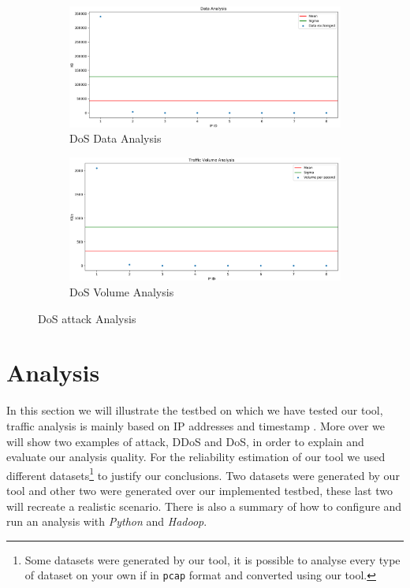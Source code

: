 \begin{figure}[h]
	\begin{subfigure}{0.48\textwidth}
		\includegraphics[width=\textwidth]{imgs/DoSMixed-data_analysis.png}
  		\caption{DoS Data Analysis}
  		\label{fig:ddos_data}
	\end{subfigure}
	\hspace*{\fill} %
	\begin{subfigure}{0.48\textwidth}
  		\includegraphics[width=\textwidth]{imgs/DoSMixed-volume_analysis.png}
  		\caption{DoS Volume Analysis}
  		\label{fig:dos_volume}
	\end{subfigure}
	\caption{DoS attack Analysis}
	\label{fig:dos_analysis}
\end{figure}
\section{Analysis}
\label{sec:analysis}
In this section we will illustrate the testbed on which we have tested our tool, traffic analysis is mainly based on IP addresses and timestamp \cite{ddos_forensics}. 
More over we will show two examples of attack, DDoS and DoS, in order to explain and evaluate our analysis quality.
For the reliability estimation of our tool we used different datasets\footnote{Some datasets were generated by our tool, it is possible to analyse every type of dataset on your own if in \texttt{pcap} format and converted using our tool.} to justify our conclusions. 
Two datasets were generated by our tool and other two were generated over our implemented testbed, these last two will recreate a realistic scenario.
There is also a summary of how to configure and run an analysis with \textit{Python} and \textit{Hadoop}.

